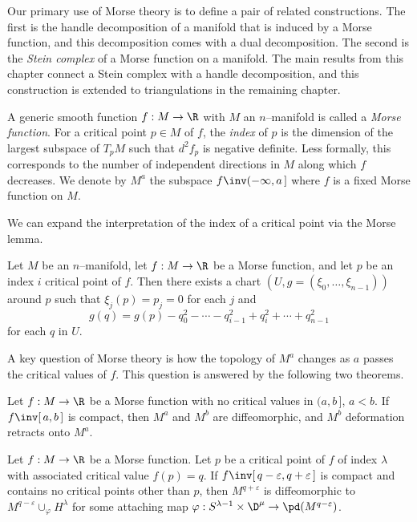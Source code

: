 \label{sec:morsetheory}

Our primary use of Morse theory is to define a pair of related constructions.
The first is the handle decomposition of a manifold that is induced by a Morse function, and this decomposition comes with a dual decomposition.
The second is the \emph{Stein complex} of a Morse function on a manifold.
The main results from this chapter connect a Stein complex with a handle decomposition, and this construction is extended to triangulations in the remaining chapter.

\begin{defn}
	A generic smooth function $f:M\to\R$ with $M$ an $n$--manifold is called a \emph{Morse function}.
	For a critical point $p\in M$ of $f$, the \emph{index} of $p$ is the dimension of the largest subspace of $T_p M$ such that $d^2f_p$ is negative definite.
	Less formally, this corresponds to the number of independent directions in $M$ along which $f$ decreases.
	We denote by $M^a$ the subspace $f\inv(-\infty,a\,]$ where $f$ is a fixed Morse function on $M$.
\end{defn}

We can expand the interpretation of the index of a critical point via the Morse lemma.

\begin{lem}
  \label{lem:morselemma}
  Let $M$ be an $n$--manifold, let $f:M\to\R$ be a Morse function, and let $p$ be an index $i$ critical point of $f$.
  Then there exists a chart $(U,g=(\xi_0,\dots,\xi_{n-1}))$ around $p$ such that $\xi_j(p)=p_j=0$ for each $j$ and
  \[
    g(q) = g(p) - q_0^2 - \cdots - q_{i-1}^2 + q_i^2 + \cdots + q_{n-1}^2
  \]
  for each $q$ in $U$.
\end{lem}

A key question of Morse theory is how the topology of $M^a$ changes as $a$ passes the critical values of $f$.
This question is answered by the following two theorems.

\begin{theorem}
	\label{thm:morseretract}
	Let $f:M\to\R$ be a Morse function with no critical values in $(a,b\,]$, $a<b$.
	If $f\inv[\,a,b\,]$ is compact, then $M^a$ and $M^b$ are diffeomorphic, and $M^b$ deformation retracts onto $M^a$.
\end{theorem}

\begin{theorem}
	\label{thm:morsehandle}
	Let $f:M\to\R$ be a Morse function.
	Let $p$ be a critical point of $f$ of index $\lambda$ with associated critical value $f(p)=q$.
	If $f\inv[\,q-\varepsilon, q+\varepsilon\,]$ is compact and contains no critical points other than $p$, then $M^{q+\varepsilon}$ is diffeomorphic to $M^{q-\varepsilon}\cup_\varphi H^\lambda$ for some attaching map $\varphi:S^{\lambda-1}\times\D^\mu\to \pd(M^{q-\varepsilon})$.
\end{theorem}

